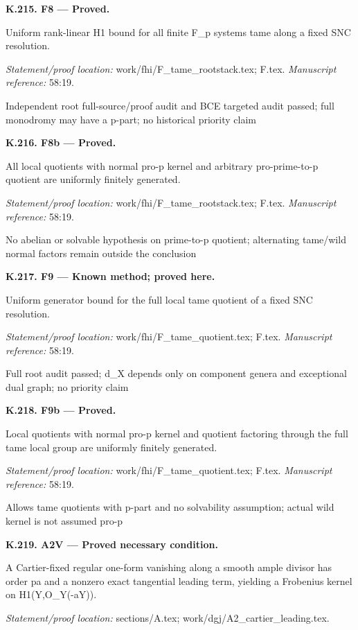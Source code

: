 \par\medskip\noindent\textbf{K.215. F8 --- Proved.}\par
Uniform rank-linear H1 bound for all finite F\_p systems tame along a fixed SNC resolution.
\par\emph{Statement/proof location:} work/fhi/F\_tame\_rootstack.tex; F.tex.
\emph{Manuscript reference:} 58:19.
\par Independent root full-source/proof audit and BCE targeted audit passed; full monodromy may have a p-part; no historical priority claim
\par\medskip\noindent\textbf{K.216. F8b --- Proved.}\par
All local quotients with normal pro-p kernel and arbitrary pro-prime-to-p quotient are uniformly finitely generated.
\par\emph{Statement/proof location:} work/fhi/F\_tame\_rootstack.tex; F.tex.
\emph{Manuscript reference:} 58:19.
\par No abelian or solvable hypothesis on prime-to-p quotient; alternating tame/wild normal factors remain outside the conclusion
\par\medskip\noindent\textbf{K.217. F9 --- Known method; proved here.}\par
Uniform generator bound for the full local tame quotient of a fixed SNC resolution.
\par\emph{Statement/proof location:} work/fhi/F\_tame\_quotient.tex; F.tex.
\emph{Manuscript reference:} 58:19.
\par Full root audit passed; d\_X depends only on component genera and exceptional dual graph; no priority claim
\par\medskip\noindent\textbf{K.218. F9b --- Proved.}\par
Local quotients with normal pro-p kernel and quotient factoring through the full tame local group are uniformly finitely generated.
\par\emph{Statement/proof location:} work/fhi/F\_tame\_quotient.tex; F.tex.
\emph{Manuscript reference:} 58:19.
\par Allows tame quotients with p-part and no solvability assumption; actual wild kernel is not assumed pro-p
\par\medskip\noindent\textbf{K.219. A2V --- Proved necessary condition.}\par
A Cartier-fixed regular one-form vanishing along a smooth ample divisor has order pa and a nonzero exact tangential leading term, yielding a Frobenius kernel on H1(Y,O\_Y(-aY)).
\par\emph{Statement/proof location:} sections/A.tex; work/dgj/A2\_cartier\_leading.tex.
